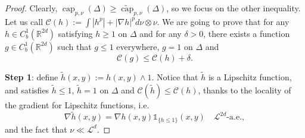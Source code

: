 \documentclass[10pt,a4paper]{amsart}
\newcommand{\R}{\mathbb{R}}
\begin{document}
\begin{proof}
Clearly, $\operatorname{cap}_{p,\nu}(\Delta) \geq \widetilde{\operatorname{cap}}_{p,\nu}(\Delta)$, so we focus on the other inequality.
    Let us call $\mathcal{C}(h) := \int |h^p| + |\nabla h|^p d\nu\otimes \nu$. We are going to prove that for any $h\in C_b^1(\R^{2d})$ satisfying $h\geq 1$ on $\Delta$ and for any $\delta>0$, there exists a function $g\in C_b^1(\R^{2d})$ such that $g\leq 1$ everywhere, $g=1$ on $\Delta$ and 
    \begin{equation}\label{eq: proof of cap lemma}
       \mathcal{C}(g) \leq \mathcal{C}(h) + \delta.
    \end{equation}

    \textbf{Step 1}: define $\tilde{h}(x,y) := h(x,y)\wedge 1$. Notice that $\tilde{h}$ is a Lipschitz function, and satisfies $\tilde{h}\leq 1$, $\tilde{h} = 1$ on $\Delta$ and $\mathcal{C}(\tilde{h})\leq \mathcal{C}(h)$, thanks to the locality of the gradient for Lipschitz functions, i.e. 
    \begin{equation}\label{eq: gradient of truncated h}
    \nabla \tilde{h}(x,y) = \nabla h(x,y) \mathds{1}_{\{h\leq 1\}}(x,y) \quad \mathcal{L}^{2d}\text{-a.e.},
    \end{equation}
    and the fact that $\nu \ll \mathcal{L}^d$.


\end{proof}
\end{document}
